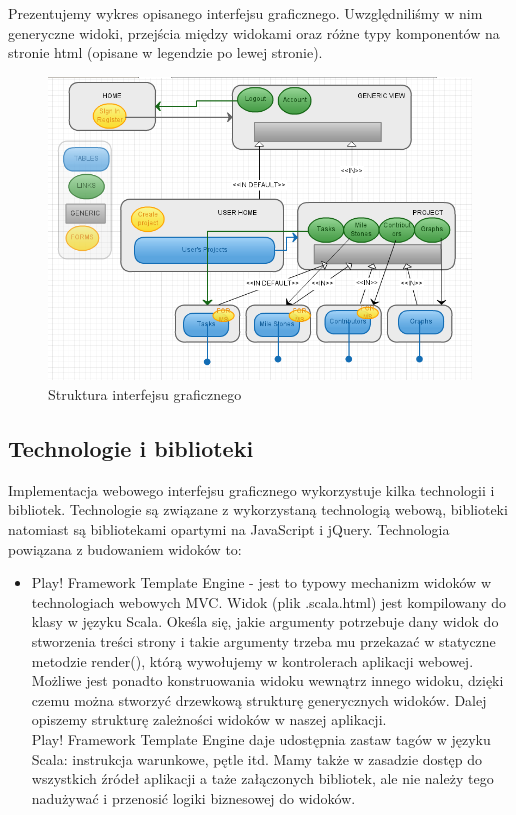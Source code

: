 \documentclass[a4paper,12pt,notitlepage]{mwrep}
\begin{document}
Prezentujemy wykres opisanego interfejsu graficznego. Uwzględniliśmy w nim generyczne widoki, przejścia między widokami oraz różne typy 
komponentów na stronie html (opisane w legendzie po lewej stronie). \\

\begin{figure}[H]
\centering
\includegraphics[scale=0.5]{images/ui_chart.png}
\caption{Struktura interfejsu graficznego}
\label{fig:ui_chart}
\end{figure}


\subsection{Technologie i biblioteki}
Implementacja webowego interfejsu graficznego wykorzystuje kilka technologii i bibliotek. Technologie są związane z 
wykorzystaną technologią webową, biblioteki natomiast są bibliotekami opartymi na JavaScript i jQuery. Technologia 
powiązana z budowaniem widoków to:
\begin{itemize}
	\item	Play! Framework Template Engine - jest to typowy mechanizm widoków w technologiach webowych MVC. 
		Widok (plik .scala.html) jest kompilowany do klasy w języku Scala. Okeśla się, jakie argumenty potrzebuje 
		dany widok do stworzenia treści strony i takie argumenty trzeba mu przekazać w statyczne metodzie render(), 
		którą wywołujemy w kontrolerach aplikacji webowej. Możliwe jest ponadto konstruowania widoku wewnątrz innego 
		widoku, dzięki czemu można stworzyć drzewkową strukturę generycznych widoków. Dalej opiszemy strukturę zależności 
		widoków w naszej aplikacji. \\
		Play! Framework Template Engine daje udostępnia zastaw tagów w języku Scala: instrukcja warunkowe, pętle itd. Mamy 
		także w zasadzie dostęp do wszystkich źródeł aplikacji a taże załączonych bibliotek, ale nie należy tego nadużywać 
		i przenosić logiki biznesowej do widoków.
\end{itemize}
\end{document}
